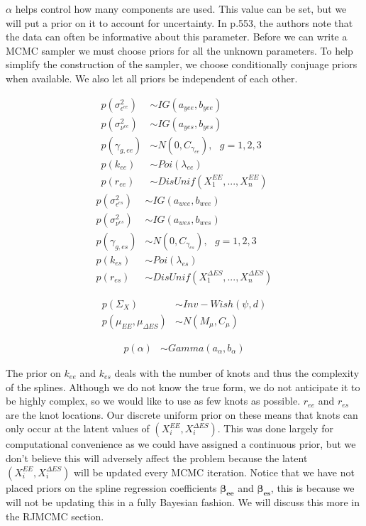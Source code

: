 \documentclass[11pt]{article}\usepackage[]{graphicx}\usepackage[]{color}
\begin{document}
$\alpha$ helps control how many components are used. This value can be set, but we will put a prior on it to account for uncertainty. In \cite{bda} p.553, the authors note that the data can often be informative about this parameter. Before we can write a MCMC sampler we must choose priors for all the unknown parameters. To help simplify the construction of the sampler, we choose conditionally conjuage priors when available.  We also let  all priors be independent of each other. 


\begin{multicols}{2}
\noindent 
  \begin{align}
  p(\sigma^2_{\epsilon^{ee}}) &\sim IG(a_{yee},b_{yee}) \\
  p(\sigma^2_{\nu^{ee}}) &\sim IG(a_{yes},b_{yes}) \\
  p(\gamma_{g,ee}) &\sim N(0,C_{\gamma_{ee}})  , \text{ } g=1,2,3 \\
  p(k_{ee}) &\sim Poi(\lambda_{ee}) \\
  p(r_{ee}) &\sim DisUnif(X_1^{EE},...,X_n^{EE})
  \end{align}
\columnbreak
  \begin{align}
  p(\sigma^2_{\epsilon^{es}}) &\sim IG(a_{wee},b_{wee}) \\
  p(\sigma^2_{\nu^{es}}) &\sim IG(a_{wes},b_{wes}) \\
  p(\gamma_{g,es}) &\sim N(0,C_{\gamma_{es}}) , \text{ } g=1,2,3 \\
  p(k_{es}) &\sim Poi(\lambda_{es}) \\
  p(r_{es}) &\sim DisUnif(X_1^{\Delta ES},...,X_n^{\Delta ES})
  \end{align}
\end{multicols}



\begin{align}
   p(\Sigma_{X}) &\sim Inv-Wish(\psi,d) \\
   p(\mu_{EE},\mu_{\Delta ES}) &\sim N(M_{\mu},C_{\mu})
\end{align}

\begin{align}
  p(\alpha) &\sim Gamma(a_{\alpha},b_{\alpha})
\end{align}


The prior on $k_{ee}$ and $k_{es}$ deals with the number of knots and thus the complexity of the splines. Although we do not know the true form, we do not anticipate it to be highly complex, so we would like to use as few knots as possible. $r_{ee}$ and $r_{es}$ are the knot locations. Our discrete uniform prior on these means that knots can only occur at the latent values of $(X_i^{EE},X_i^{\Delta ES})$. This was done largely for computational convenience as we could have assigned a continuous prior, but we don't believe this will adversely affect the problem because the latent $(X_i^{EE},X_i^{\Delta ES})$ will be updated every MCMC iteration. Notice that we have not placed priors on the spline regression coefficients $\boldsymbol{\beta_{ee}}$ and $\boldsymbol{\beta_{es}}$, this is because we will not be updating this in a fully Bayesian fashion. We will discuss this more in the RJMCMC section.
\end{document}
